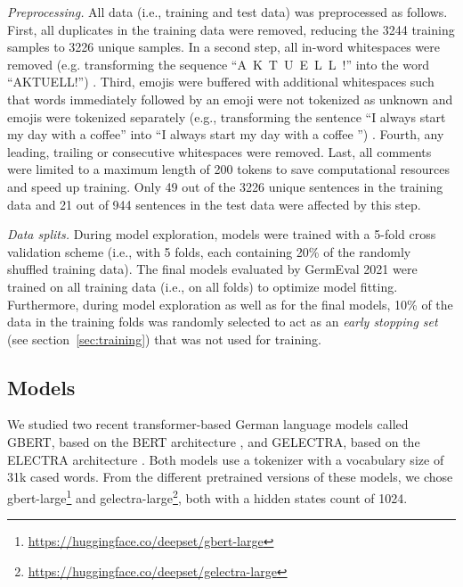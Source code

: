 \documentclass[11pt,a4paper]{article}
\begin{document}
\emph{Preprocessing.} All data (i.e., training and test data) was preprocessed as follows. 
First, all duplicates in the training data were removed, reducing the 3244 training samples to 3226 unique samples.
In a second step, all in-word whitespaces were removed (e.g. transforming the sequence ``A~K~T~U~E~L~L~!'' into the word ``AKTUELL!'') \cite{Paraschiv2019}.
Third, emojis were buffered with additional whitespaces such that words immediately followed by an emoji were not tokenized as unknown and emojis were tokenized separately (e.g., transforming the sentence ``I always start my day with a \mbox{coffee\hspace{2pt}\Coffeecup\Coffeecup\Coffeecup}'' into ``I always start my day with a coffee \hspace{3pt} \Coffeecup \hspace{3pt} \Coffeecup \hspace{3pt} \Coffeecup'') \cite{Risch2020}.
Fourth, any leading, trailing or consecutive whitespaces were removed.
Last, all comments were limited to a maximum length of 200 tokens to save computational resources and speed up training.
Only 49 out of the 3226 unique sentences in the training data and 21 out of 944 sentences in the test data were affected by this step.

\emph{Data splits.} During model exploration, models were trained with a 5-fold cross validation scheme (i.e., with 5 folds, each containing 20\% of the randomly shuffled training data). The final models evaluated by GermEval 2021 were trained on all training data (i.e., on all folds) to optimize model fitting.
Furthermore, during model exploration as well as for the final models, 10\% of the data in the training folds was randomly selected to act as an \emph{early stopping set} (see section~\ref{sec:training}) that was not used for training.


\subsection{Models}
\label{ssec:models}

We studied two recent transformer-based German language models \cite{Chan2020} called GBERT, based on the BERT architecture \cite{Devlin2018}, and GELECTRA, based on the ELECTRA architecture \cite{Clark2020}.
Both models use a tokenizer with a vocabulary size of 31k cased words.
From the different pretrained versions of these models, we chose gbert-large\footnote{\url{https://huggingface.co/deepset/gbert-large}} and gelectra-large\footnote{\url{https://huggingface.co/deepset/gelectra-large}}, both with a hidden states count of 1024.
\end{document}
